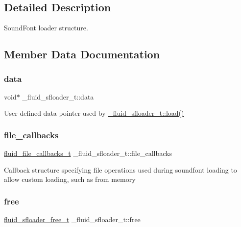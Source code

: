 \subsection{Detailed Description}
Sound\+Font loader structure. 

\subsection{Member Data Documentation}
\mbox{\label{struct__fluid__sfloader__t_a128547f2341db8c9f5ddb0158d1d4235}} 
\subsubsection{\texorpdfstring{data}{data}}
{\footnotesize\ttfamily void$\ast$ \+\_\+fluid\+\_\+sfloader\+\_\+t\+::data}

User defined data pointer used by \hyperlink{struct__fluid__sfloader__t_ad0c3fd755c8c9a4333e7d0a15f50844f}{\+\_\+fluid\+\_\+sfloader\+\_\+t\+::load()} \mbox{\label{struct__fluid__sfloader__t_a03d8c51a7b64dd670899f6affaa43805}} 
\subsubsection{\texorpdfstring{file\+\_\+callbacks}{file\_callbacks}}
{\footnotesize\ttfamily \hyperlink{types_8h_a6a223e4b8d83753d95c87e1feed58227}{fluid\+\_\+file\+\_\+callbacks\+\_\+t} \+\_\+fluid\+\_\+sfloader\+\_\+t\+::file\+\_\+callbacks}

Callback structure specifying file operations used during soundfont loading to allow custom loading, such as from memory \mbox{\label{struct__fluid__sfloader__t_a00c9b284ca7894da330b306ab091ed14}} 
\subsubsection{\texorpdfstring{free}{free}}
{\footnotesize\ttfamily \hyperlink{sfont_8h_aab801ff11ddf556d3f34e82c2ca02897}{fluid\+\_\+sfloader\+\_\+free\+\_\+t} \+\_\+fluid\+\_\+sfloader\+\_\+t\+::free}

